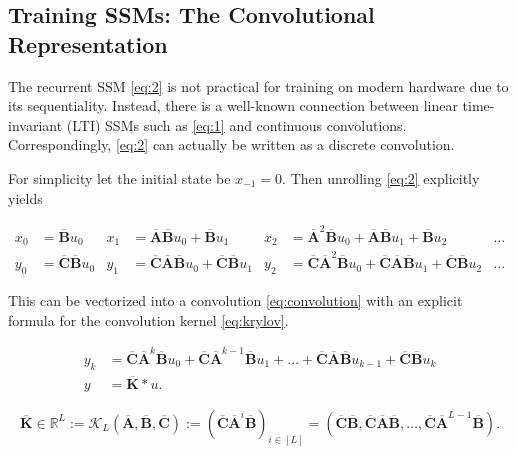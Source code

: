 \subsection{Training SSMs: The Convolutional Representation}
\label{sec:ss-convolution}

The recurrent SSM \eqref{eq:2} is not practical for training on modern hardware due to its sequentiality. Instead, there is a well-known connection between linear time-invariant (LTI) SSMs such as \eqref{eq:1} and continuous convolutions. Correspondingly, \eqref{eq:2} can actually be written as a discrete convolution.

For simplicity let the initial state be \( x_{-1} = 0 \).
Then unrolling \eqref{eq:2} explicitly yields

\begin{align*}
  x_0 &= \bm{\overline{B}} u_0 & x_1 &= \bm{\overline{A}} \bm{\overline{B}} u_0 + \bm{\overline{B}} u_1 & x_2 &= \bm{\overline{A}}^2 \bm{\overline{B}} u_0 + \bm{\overline{A}} \bm{\overline{B}} u_1 + \bm{\overline{B}} u_2 & \dots
  \\
  y_0 &= \bm{\overline{C}} \bm{\overline{B}} u_0 & y_1 &= \bm{\overline{C}} \bm{\overline{A}} \bm{\overline{B}} u_0 + \bm{\overline{C}} \bm{\overline{B}} u_1 & y_2 &= \bm{\overline{C}} \bm{\overline{A}}^2 \bm{\overline{B}} u_0 + \bm{\overline{C}} \bm{\overline{A}} \bm{\overline{B}} u_1 + \bm{\overline{C}} \bm{\overline{B}} u_2 & \dots
\end{align*}

This can be vectorized into a convolution \eqref{eq:convolution} with an explicit formula for the convolution kernel \eqref{eq:krylov}.

\begin{equation}
  \label{eq:convolution}
  \begin{split}
    y_k &= \bm{\overline{C}} \bm{\overline{A}}^k \bm{\overline{B}} u_0 + \bm{\overline{C}} \bm{\overline{A}}^{k-1} \bm{\overline{B}} u_1 + \dots + \bm{\overline{C}} \bm{\overline{A}} \bm{\overline{B}} u_{k-1} + \bm{\overline{C}}\bm{\overline{B}} u_k
    \\
    y &= \bm{\overline{K}} \ast u 
    .
  \end{split}
\end{equation}

\begin{equation}
  \label{eq:krylov}
  \bm{\overline{K}} \in \mathbb{R}^L :=
  \mathcal{K}_L(\bm{\overline{A}}, \bm{\overline{B}}, \bm{\overline{C}}) := \left(\bm{\overline{C}} \bm{\overline{A}}^i \bm{\overline{B}}\right)_{i \in [L]} = (\bm{\overline{C}}\bm{\overline{B}}, \bm{\overline{C}}\bm{\overline{A}}\bm{\overline{B}}, \dots, \bm{\overline{C}}\bm{\overline{A}}^{L-1}\bm{\overline{B}})
  .
\end{equation}

